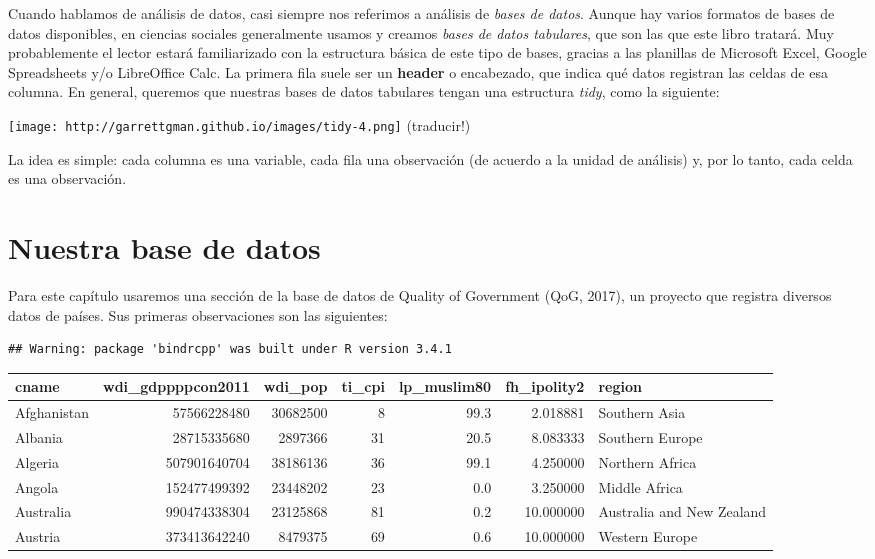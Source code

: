 \documentclass[]{book}
\begin{document}
Cuando hablamos de análisis de datos, casi siempre nos referimos a
análisis de \emph{bases de datos}. Aunque hay varios formatos de bases
de datos disponibles, en ciencias sociales generalmente usamos y creamos
\emph{bases de datos tabulares}, que son las que este libro tratará. Muy
probablemente el lector estará familiarizado con la estructura básica de
este tipo de bases, gracias a las planillas de Microsoft Excel, Google
Spreadsheets y/o LibreOffice Calc. La primera fila suele ser un
\textbf{header} o encabezado, que indica qué datos registran las celdas
de esa columna. En general, queremos que nuestras bases de datos
tabulares tengan una estructura \emph{tidy}, como la siguiente:

\texttt{[image: http://garrettgman.github.io/images/tidy-4.png]}
(traducir!)

La idea es simple: cada columna es una variable, cada fila una
observación (de acuerdo a la unidad de análisis) y, por lo tanto, cada
celda es una observación.

\section{Nuestra base de datos}\label{nuestra-base-de-datos}

Para este capítulo usaremos una sección de la base de datos de Quality
of Government (QoG, 2017), un proyecto que registra diversos datos de
países. Sus primeras observaciones son las siguientes:

\begin{verbatim}
## Warning: package 'bindrcpp' was built under R version 3.4.1
\end{verbatim}

\begin{tabular}{l|r|r|r|r|r|l}
\hline
cname & wdi\_gdppppcon2011 & wdi\_pop & ti\_cpi & lp\_muslim80 & fh\_ipolity2 & region\\
\hline
Afghanistan & 57566228480 & 30682500 & 8 & 99.3 & 2.018881 & Southern Asia\\
\hline
Albania & 28715335680 & 2897366 & 31 & 20.5 & 8.083333 & Southern Europe\\
\hline
Algeria & 507901640704 & 38186136 & 36 & 99.1 & 4.250000 & Northern Africa\\
\hline
Angola & 152477499392 & 23448202 & 23 & 0.0 & 3.250000 & Middle Africa\\
\hline
Australia & 990474338304 & 23125868 & 81 & 0.2 & 10.000000 & Australia and New Zealand\\
\hline
Austria & 373413642240 & 8479375 & 69 & 0.6 & 10.000000 & Western Europe\\
\hline
\end{tabular}
\end{document}
